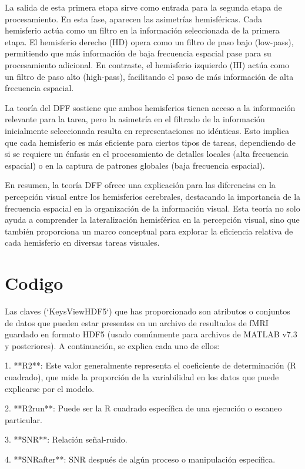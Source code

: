 \documentclass{article}
\begin{document}
	La salida de esta primera etapa sirve como entrada para la segunda etapa de procesamiento. En esta fase, aparecen las asimetrías hemisféricas. Cada hemisferio actúa como un filtro en la información seleccionada de la primera etapa. El hemisferio derecho (HD) opera como un filtro de paso bajo (low-pass), permitiendo que más información de baja frecuencia espacial pase para su procesamiento adicional. En contraste, el hemisferio izquierdo (HI) actúa como un filtro de paso alto (high-pass), facilitando el paso de más información de alta frecuencia espacial.
	
	La teoría del DFF sostiene que ambos hemisferios tienen acceso a la información relevante para la tarea, pero la asimetría en el filtrado de la información inicialmente seleccionada resulta en representaciones no idénticas. Esto implica que cada hemisferio es más eficiente para ciertos tipos de tareas, dependiendo de si se requiere un énfasis en el procesamiento de detalles locales (alta frecuencia espacial) o en la captura de patrones globales (baja frecuencia espacial).
	
	En resumen, la teoría DFF ofrece una explicación para las diferencias en la percepción visual entre los hemisferios cerebrales, destacando la importancia de la frecuencia espacial en la organización de la información visual. Esta teoría no solo ayuda a comprender la lateralización hemisférica en la percepción visual, sino que también proporciona un marco conceptual para explorar la eficiencia relativa de cada hemisferio en diversas tareas visuales.
	
	\section{Codigo}
	
	Las claves (`KeysViewHDF5`) que has proporcionado son atributos o conjuntos de datos que pueden estar presentes en un archivo de resultados de fMRI guardado en formato HDF5 (usado comúnmente para archivos de MATLAB v7.3 y posteriores). A continuación, se explica cada uno de ellos:
	
	1. **R2**: Este valor generalmente representa el coeficiente de determinación (R cuadrado), que mide la proporción de la variabilidad en los datos que puede explicarse por el modelo.
	
	2. **R2run**: Puede ser la R cuadrado específica de una ejecución o escaneo particular.
	
	3. **SNR**: Relación señal-ruido.
	
	4. **SNRafter**: SNR después de algún proceso o manipulación específica.
	
\end{document}
